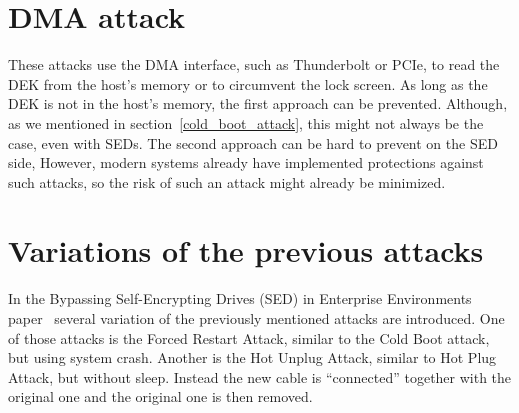 \section{DMA attack}

These attacks use the DMA interface, such as Thunderbolt or PCIe, to read the DEK from the host's memory or to circumvent the lock screen. As long as the DEK is not in the host's memory, the first approach can be prevented. Although, as we mentioned in section~\ref{cold_boot_attack}, this might not always be the case, even with SEDs.
The second approach can be hard to prevent on the SED side, 
However, modern systems already have implemented protections against such attacks, so the risk of such an attack might already be minimized.

\section{Variations of the previous attacks}

In the Bypassing Self-Encrypting Drives (SED) in Enterprise Environments paper~\cite{bypassing_in_enterprise} several variation of the previously mentioned attacks are introduced.
One of those attacks is the Forced Restart Attack, similar to the Cold Boot attack, but using system crash. Another is the Hot Unplug Attack, similar to Hot Plug Attack, but without sleep. Instead the new cable is ``connected'' together with the original one and the original one is then removed. 

